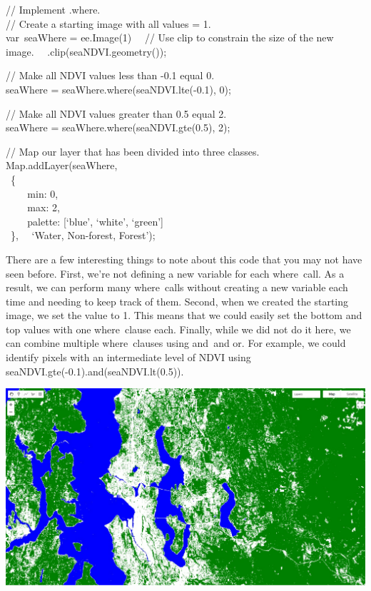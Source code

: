 \documentclass[
  letterpaper,
  DIV=11,
  numbers=noendperiod]{scrreprt}
\begin{document}
// Implement .where.\\
// Create a starting image with all values = 1.\\
var~seaWhere = ee.Image(1)~ ~// Use clip to constrain the size of the
new image.~ ~.clip(seaNDVI.geometry());

// Make all NDVI values less than -0.1 equal 0.\\
seaWhere = seaWhere.where(seaNDVI.lte(-0.1), 0);

// Make all NDVI values greater than 0.5 equal 2.\\
seaWhere = seaWhere.where(seaNDVI.gte(0.5), 2);

// Map our layer that has been divided into three classes.\\
Map.addLayer(seaWhere,\\
\hspace*{0.333em} ~\{\\
\hspace*{0.333em} ~ ~ ~min: 0,\\
\hspace*{0.333em} ~ ~ ~max: 2,\\
\hspace*{0.333em} ~ ~ ~palette: {[}`blue', `white', `green'{]}\\
\hspace*{0.333em} ~\},~ ~`Water, Non-forest, Forest');

There are a few interesting things to note about this code that you may
not have seen before. First, we're not defining a new variable for each
where~call. As a result, we can perform many where~calls without
creating a new variable each time and needing to keep track of them.
Second, when we created the starting image, we set the value to 1. This
means that we could easily set the bottom and top values with one
where~clause each. Finally, while we did not do it here, we can combine
multiple where~clauses using and~and or. For example, we could identify
pixels with an intermediate level of NDVI using
seaNDVI.gte(-0.1).and(seaNDVI.lt(0.5)).

\includegraphics{./F2/image37.png}
\end{document}
